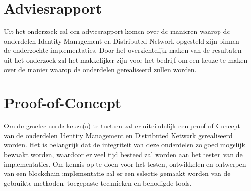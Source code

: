 \section{Adviesrapport}

Uit het onderzoek zal een adviesrapport komen over de manieren waarop de onderdelen Identity Management en Distributed Network opgesteld zijn binnen de onderzochte implementaties. Door het overzichtelijk maken van de resultaten uit het onderzoek zal het makkelijker zijn voor het bedrijf om een keuze te maken over de manier waarop de onderdelen gerealiseerd zullen worden.

\section{Proof-of-Concept}

Om de geselecteerde keuze(s) te toetsen zal er uiteindelijk een proof-of-Concept van de onderdelen Identity Management en Distributed Network gerealiseerd worden. Het is belangrijk dat de integriteit van deze onderdelen zo goed mogelijk bewaakt worden, waardoor er veel tijd besteed zal worden aan het testen van de implementaties. Om kennis op te doen voor het testen, ontwikkelen en ontwerpen van een blockchain implementatie zal er een selectie gemaakt worden van de gebruikte methoden, toegepaste technieken en benodigde tools.